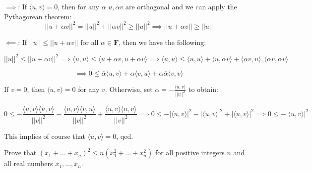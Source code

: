 \begin{solution}

$\implies$: If $\langle u, v \rangle = 0$, then for any $\alpha$ $u, \alpha v$ are orthogonal and we can apply the Pythagorean theorem:
$$ \lvert \vert u + \alpha v \rvert \rvert^2 = \lvert \lvert u \rvert \rvert^2 + \lvert \lvert \alpha v \rvert \rvert^2 \geq \lvert \lvert u \rvert \rvert ^2 \implies \lvert \lvert u + \alpha v \rvert \rvert \geq \lvert \lvert u \rvert \rvert$$

$\impliedby$: If $\lvert \lvert u \rvert \rvert \leq \lvert \lvert u + \alpha v \rvert \rvert$ for all $\alpha \in \mathbf{F}$, then we have the following:

$$ \lvert \lvert u \rvert \rvert^2 \leq \lvert \lvert u + \alpha v \rvert \rvert^2 \implies \langle u, u \rangle \leq \langle u + \alpha v, u + \alpha v \rangle \implies \langle u, u \rangle \leq \langle u, u \rangle + \langle u, \alpha v \rangle + \langle \alpha v, u \rangle, \langle \alpha v, \alpha v \rangle$$

$$\implies 0 \leq \overline{\alpha} \langle u, v \rangle + \alpha \langle v, u \rangle + \alpha \overline{\alpha} \langle v, v \rangle$$

If $v = 0$, then $\langle u, v \rangle = 0$ for any $v$. Otherwise, set $\alpha = - \frac{\langle u, v \rangle}{\lvert \lvert v \rvert \rvert^2}$ to obtain:

$$ 0 \leq -\frac{ \overline{\langle u, v \rangle} \langle u, v \rangle}{\lvert \lvert v \rvert \rvert^2} - \frac{ \langle u, v \rangle \langle v, u \rangle}{\lvert \lvert v \rvert \rvert^2} + \frac{\langle u, v \rangle \overline{\langle u, v \rangle}}{\lvert \lvert v \rvert \rvert^2} \implies 0 \leq -\lvert \langle u, v \rangle \rvert^2 - \lvert \langle u, v \rangle \rvert^2 + \lvert \langle u, v \rangle \vert^2 \implies 0 \leq - \lvert \langle u, v \rangle \rvert^2$$

This implies of course that $\langle u, v \rangle = 0$, qed.
\end{solution}

\newpage
\begin{exercise}{12}
Prove that $(x_1 + \ldots + x_n)^2 \leq n(x_1^2 + \ldots + x_n^2)$ for all positive integers $n$ and all real numbers $x_1, \ldots, x_n$.
\end{exercise}

